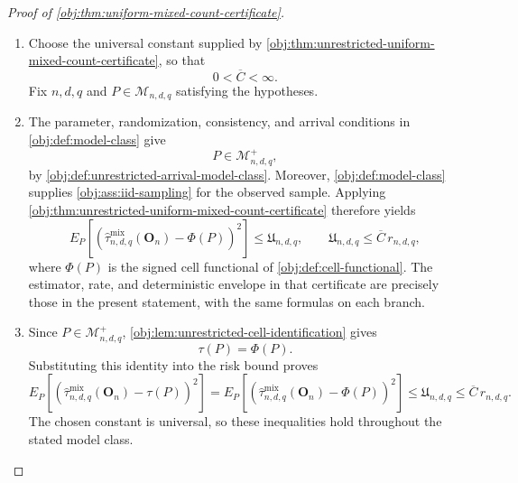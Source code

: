 \documentclass[11pt]{article}
\begin{document}
\begin{proof}[Proof of \cref{obj:thm:uniform-mixed-count-certificate}]
\begin{enumerate}
\item Choose the universal constant supplied by
\cref{obj:thm:unrestricted-uniform-mixed-count-certificate}, so that
\[
0<\overline C<\infty.
\]
Fix \(n,d,q\) and \(P\in\mathcal M_{n,d,q}\) satisfying the hypotheses.

\item The parameter, randomization, consistency, and arrival conditions in
\cref{obj:def:model-class} give
\[
P\in\mathcal M^{+}_{n,d,q},
\]
by \cref{obj:def:unrestricted-arrival-model-class}. Moreover,
\cref{obj:def:model-class} supplies
\cref{obj:ass:iid-sampling} for the observed sample. Applying
\cref{obj:thm:unrestricted-uniform-mixed-count-certificate} therefore yields
\[
E_P\!\left[
\left(\widehat\tau^{\mathrm{mix}}_{n,d,q}(\mathbf O_n)-\Phi(P)\right)^2
\right]
\le \mathfrak U_{n,d,q},
\qquad
\mathfrak U_{n,d,q}\le \overline C\,r_{n,d,q},
\]
where \(\Phi(P)\) is the signed cell functional of
\cref{obj:def:cell-functional}. The estimator, rate, and deterministic
envelope in that certificate are precisely those in the present statement,
with the same formulas on each branch.

\item Since \(P\in\mathcal M^{+}_{n,d,q}\),
\cref{obj:lem:unrestricted-cell-identification} gives
\[
\tau(P)=\Phi(P).
\]
Substituting this identity into the risk bound proves
\[
E_P\!\left[
\left(\widehat\tau^{\mathrm{mix}}_{n,d,q}(\mathbf O_n)-\tau(P)\right)^2
\right]
=
E_P\!\left[
\left(\widehat\tau^{\mathrm{mix}}_{n,d,q}(\mathbf O_n)-\Phi(P)\right)^2
\right]
\le \mathfrak U_{n,d,q}
\le \overline C\,r_{n,d,q}.
\]
The chosen constant is universal, so these inequalities hold throughout
the stated model class.
\end{enumerate}
\end{proof}
\end{document}

